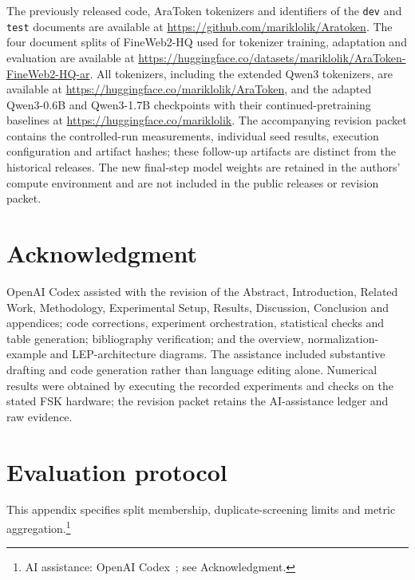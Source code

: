 \documentclass{ieeeaccess}
\begin{document}
The previously released code, AraToken tokenizers and identifiers of the
\texttt{dev} and \texttt{test} documents are available at \url{https://github.com/mariklolik/Aratoken}. The four document
splits of FineWeb2-HQ used for tokenizer training, adaptation and evaluation
are available at
\url{https://huggingface.co/datasets/mariklolik/AraToken-FineWeb2-HQ-ar}.
All tokenizers, including the extended Qwen3 tokenizers, are available at
\url{https://huggingface.co/mariklolik/AraToken}, and the adapted Qwen3-0.6B
and Qwen3-1.7B checkpoints with their continued-pretraining baselines at
\url{https://huggingface.co/mariklolik}. The accompanying revision packet
contains the controlled-run measurements, individual seed results, execution
configuration and artifact hashes; these follow-up artifacts are distinct
from the historical releases.
The new final-step model weights are retained in the authors' compute
environment and are not included in the public releases or revision packet.

\section*{Acknowledgment}
OpenAI Codex \cite{openaicodex2026} assisted with the revision of the Abstract, Introduction,
Related Work, Methodology, Experimental Setup, Results, Discussion,
Conclusion and appendices; code corrections, experiment orchestration,
statistical checks and table generation; bibliography verification; and
the overview, normalization-example and LEP-architecture diagrams.
The assistance included substantive drafting and code generation rather
than language editing alone. Numerical results were obtained by executing
the recorded experiments and checks on the stated FSK hardware; the
revision packet retains the AI-assistance ledger and raw evidence.

\appendices

\section{Evaluation protocol}
\label{app:protocol}

This appendix specifies split membership, duplicate-screening limits and
metric aggregation.\footnote{AI assistance: OpenAI Codex~\cite{openaicodex2026}; see Acknowledgment.}
\end{document}
